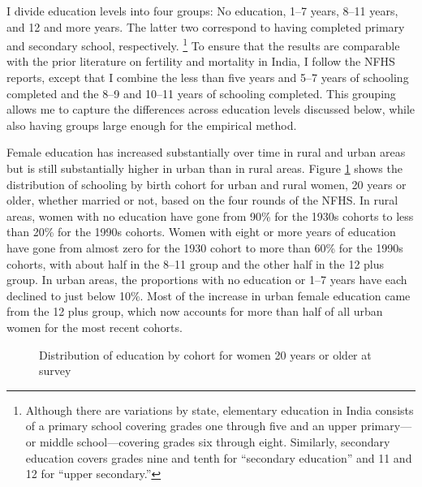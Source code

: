 \documentclass[12pt,letterpaper]{article}
\begin{document}

I divide education levels into four groups: No education, 1--7 years, 8--11 years, and 
12 and more years.
The latter two correspond to having completed primary and secondary school, 
respectively.%
\footnote{
Although there are variations by state, elementary education in India consists of a 
primary school covering grades one through five and an upper primary---or middle 
school---covering grades six through eight. 
Similarly, secondary education covers grades nine and tenth for ``secondary education'' 
and 11 and 12 for ``upper secondary.''
}
To ensure that the results are comparable with the prior literature on fertility
and mortality in India, I follow the NFHS reports, except that I combine the 
less than five years and 5--7 years of schooling completed and the 8--9 
and 10--11 years of schooling completed.
This grouping allows me to capture the differences across education levels discussed below, 
while also having groups large enough for the empirical method.


Female education has increased substantially over time in rural and urban areas but 
is still substantially higher in urban than in rural areas.
Figure \ref{fig:education_over_time} shows the distribution of schooling by birth 
cohort for urban and rural women, 
20 years or older, whether married or not, based on the four rounds of the NFHS.
In rural areas, women with no education have gone from 90\% for the 1930s cohorts to 
less than 20\% for the 1990s cohorts.
Women with eight or more years of education have gone from almost zero for the 1930 cohort 
to more than 60\% for the 1990s cohorts, with about half in the 8--11 group and the 
other half in the 12 plus group.
In urban areas, the proportions with no education or 1--7 years have each declined 
to just below 10\%.
Most of the increase in urban female education came from the 12 plus group, which 
now accounts for more than half of all urban women for the most recent cohorts.

\begin{figure}[htpb]
\centering
{} 
\caption{Distribution of education by cohort for women 20 years or older at survey}
\label{fig:education_over_time}
\end{figure}
\end{document}
